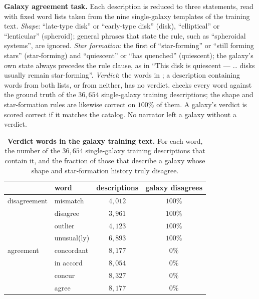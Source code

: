\textbf{Galaxy agreement task.} Each description is reduced to three statements,
read with fixed word lists taken from the nine single-galaxy templates of the
training text. \emph{Shape}: ``late-type disk'' or ``early-type disk'' (disk),
``elliptical'' or ``lenticular'' (spheroid); general phrases that state the rule,
such as ``spheroidal systems'', are ignored. \emph{Star formation}: the first of
``star-forming'' or ``still forming stars'' (star-forming) and ``quiescent'' or
``has quenched'' (quiescent); the galaxy's own state always precedes the rule
clause, as in ``This disk is quiescent --- \ldots{} disks usually remain
star-forming''. \emph{Verdict}: the words in ; a
description containing words from both lists, or from neither, has no verdict.
 checks every word against the ground truth of the
$36{,}654$ single-galaxy training descriptions; the shape and star-formation
rules are likewise correct on $100\%$ of them. A galaxy's verdict is scored
correct if it matches the catalog. No narrator left a galaxy without a verdict.

\begin{table}[h]\centering\small
\caption{\textbf{Verdict words in the galaxy training text.} For each word, the
number of the $36{,}654$ single-galaxy training descriptions that contain it, and
the fraction of those that describe a galaxy whose shape and star-formation
history truly disagree.}
\label{tab:verdictwords}
\begin{tabular}{llcc}
\toprule
 & word & descriptions & galaxy disagrees \\
\midrule
disagreement & mismatch   & $4{,}012$ & $100\%$ \\
                              & disagree   & $3{,}961$ & $100\%$ \\
                              & outlier    & $4{,}123$ & $100\%$ \\
                              & unusual(ly)& $6{,}893$ & $100\%$ \\
\midrule
agreement    & concordant & $8{,}177$ & $0\%$ \\
                              & in accord  & $8{,}054$ & $0\%$ \\
                              & concur     & $8{,}327$ & $0\%$ \\
                              & agree      & $8{,}177$ & $0\%$ \\
\bottomrule
\end{tabular}
\end{table}

